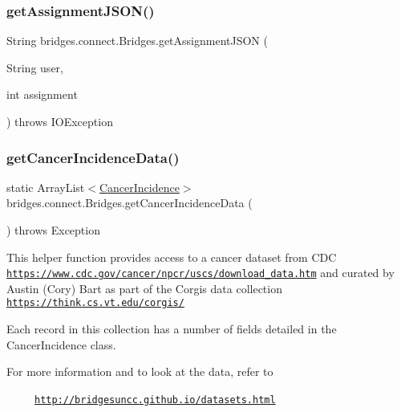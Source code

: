 \subsubsection{\texorpdfstring{get\+Assignment\+J\+S\+O\+N()}{getAssignmentJSON()}\hspace{0.1cm}{\footnotesize\ttfamily [2/2]}}
{\footnotesize\ttfamily String bridges.\+connect.\+Bridges.\+get\+Assignment\+J\+S\+ON (\begin{DoxyParamCaption}\item[{String}]{user,  }\item[{int}]{assignment }\end{DoxyParamCaption}) throws I\+O\+Exception}

\mbox{\label{classbridges_1_1connect_1_1_bridges_ad3d3afcf9df9e2b87d069bc050029628}} 
\subsubsection{\texorpdfstring{get\+Cancer\+Incidence\+Data()}{getCancerIncidenceData()}}
{\footnotesize\ttfamily static Array\+List$<$\mbox{\hyperlink{classbridges_1_1data__src__dependent_1_1_cancer_incidence}{Cancer\+Incidence}}$>$ bridges.\+connect.\+Bridges.\+get\+Cancer\+Incidence\+Data (\begin{DoxyParamCaption}{ }\end{DoxyParamCaption}) throws Exception\hspace{0.3cm}{\ttfamily [static]}}

This helper function provides access to a cancer dataset from C\+DC \href{https://www.cdc.gov/cancer/npcr/uscs/download_data.htm}{\tt https\+://www.\+cdc.\+gov/cancer/npcr/uscs/download\+\_\+data.\+htm} and curated by Austin (Cory) Bart as part of the Corgis data collection \href{https://think.cs.vt.edu/corgis/}{\tt https\+://think.\+cs.\+vt.\+edu/corgis/}

Each record in this collection has a number of fields detailed in the Cancer\+Incidence class.

For more information and to look at the data, refer to 

~~~~~\href{http://bridgesuncc.github.io/datasets.html}{\tt http\+://bridgesuncc.\+github.\+io/datasets.\+html} 


